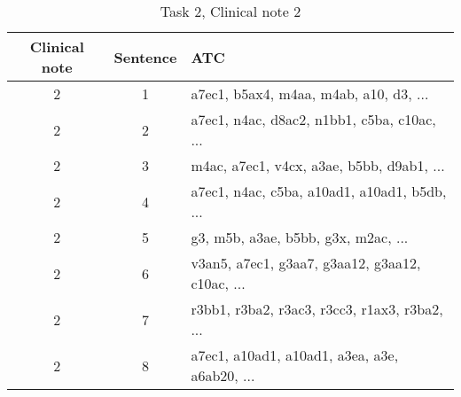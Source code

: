 \begin{table}[htbp] \footnotesize \center
\caption{Task 2, Clinical note 2 \label{tab:t2c2}}
\begin{tabularx}{\textwidth}{c c X}
    \toprule
    Clinical note & Sentence & ATC \\
    \midrule
	 2 & 1 & a7ec1, b5ax4, m4aa, m4ab, a10, d3, ... \\
	 2 & 2 & a7ec1, n4ac, d8ac2, n1bb1, c5ba, c10ac, ... \\
	 2 & 3 & m4ac, a7ec1, v4cx, a3ae, b5bb, d9ab1, ... \\
	 2 & 4 & a7ec1, n4ac, c5ba, a10ad1, a10ad1, b5db, ... \\
	 2 & 5 & g3, m5b, a3ae, b5bb, g3x, m2ac, ... \\
	 2 & 6 & v3an5, a7ec1, g3aa7, g3aa12, g3aa12, c10ac, ... \\
	 2 & 7 & r3bb1, r3ba2, r3ac3, r3cc3, r1ax3, r3ba2, ... \\
	 2 & 8 & a7ec1, a10ad1, a10ad1, a3ea, a3e, a6ab20, ... \\
	\bottomrule
\end{tabularx}
\end{table}


